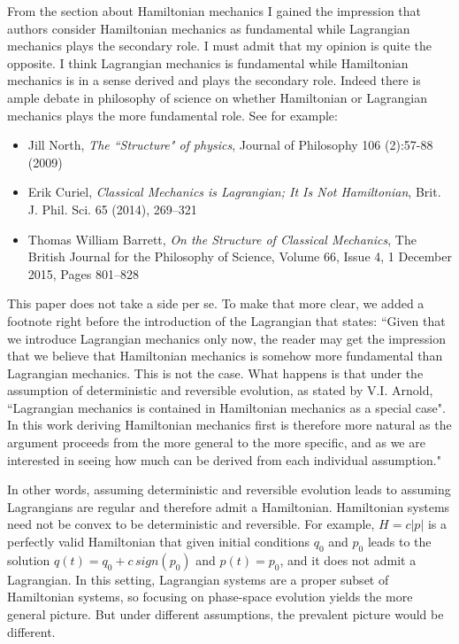 \documentclass[10pt]{article}
\begin{document}
\begin{response}{From the section about Hamiltonian mechanics I gained the impression that authors
consider Hamiltonian mechanics as fundamental while Lagrangian mechanics plays the
secondary role. I must admit that my opinion is quite the opposite. I think Lagrangian
mechanics is fundamental while Hamiltonian mechanics is in a sense derived and plays
the secondary role.}
Indeed there is ample debate in philosophy of science on whether Hamiltonian or Lagrangian mechanics plays the more fundamental role. See for example:
\begin{itemize}
	\item Jill North, \emph{The ``Structure" of physics}, 
	Journal of Philosophy 106 (2):57-88 (2009)
	\item  Erik Curiel, \emph{Classical Mechanics is Lagrangian; It Is Not Hamiltonian}, Brit. J. Phil. Sci. 65 (2014), 269–321
	\item Thomas William Barrett, \emph{On the Structure of Classical Mechanics},	
	The British Journal for the Philosophy of Science, Volume 66, Issue 4, 1 December 2015, Pages 801–828
\end{itemize}

This paper does not take a side per se. To make that more clear, we added a footnote right before the introduction of the Lagrangian that states: ``Given that we introduce Lagrangian mechanics only now, the reader may get the impression that we believe that Hamiltonian mechanics is somehow more fundamental than Lagrangian mechanics. This is not the case. What happens is that under the assumption of deterministic and reversible evolution, as stated by V.I. Arnold, ``Lagrangian mechanics is contained in Hamiltonian mechanics as a special case". In this work deriving Hamiltonian mechanics first is therefore more natural as the argument proceeds from the more general to the more specific, and as we are interested in seeing how much can be derived from each individual assumption."

In other words, assuming deterministic and reversible evolution leads to assuming Lagrangians are regular and therefore admit a Hamiltonian. Hamiltonian systems need not be convex to be deterministic and reversible. For example, $H=c|p|$ is a perfectly valid Hamiltonian that given initial conditions $q_0$ and $p_0$ leads to the solution $q(t)=q_0 + c \, sign(p_0)$ and $p(t)=p_0$, and it does not admit a Lagrangian. In this setting, Lagrangian systems are a proper subset of Hamiltonian systems, so focusing on phase-space evolution yields the more general picture. But under different assumptions, the prevalent picture would be different.

\end{response}
\end{document}
